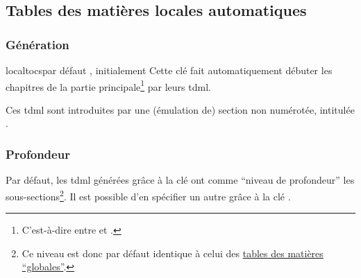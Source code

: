 \subsection{Tables des matières locales automatiques}
\label{sec-localtoc}%
%

\subsubsection{Génération}
\label{sec:generation}

%


\begin{docKey}[][doc new=2016-10-30]{localtocs}{}{par défaut ,
    initialement }
  Cette clé fait automatiquement débuter les chapitres de la partie
  principale\footnote{C'est-à-dire entre  et
    .} par leurs \gls{tdml}.
\end{docKey}

Ces \gls{tdml} sont introduites par une (émulation de) section
non numérotée, intitulée .

\subsubsection{Profondeur}
\label{sec:profondeur}

Par défaut, les \gls{tdml} générées grâce à la clé
 ont comme \enquote{niveau de profondeur} les
sous-sections\footnote{Ce niveau est donc par défaut identique à celui des
  \hyperref[sec-table-des-matieres]{tables des matières
    \enquote{globales}}.}. Il est possible d'en spécifier un autre grâce à la
clé .

